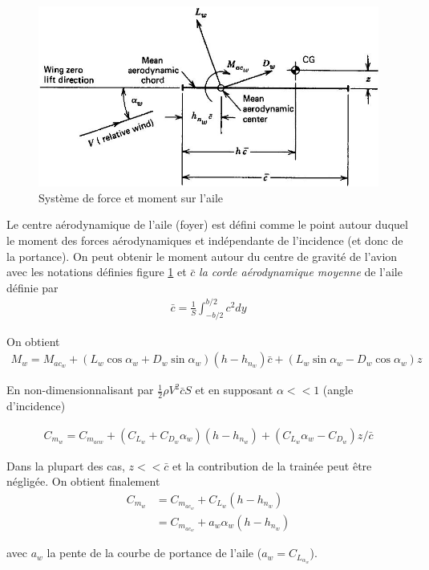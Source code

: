 \documentclass{report}
\begin{document}
\begin{figure}[h!]
    \centering
    \includegraphics[scale=0.7]{22.JPG}
    \caption{Système de force et moment sur l'aile}
    \label{22}
\end{figure}

Le centre aérodynamique de l'aile (foyer) est défini comme le point autour duquel le moment des forces aérodynamiques et indépendante de l'incidence (et donc de la portance). On peut obtenir le moment autour du centre de gravité de l'avion avec les notations définies figure \ref{22} et $\bar{c}$ \textit{la corde aérodynamique moyenne} de l'aile définie par 
\begin{eqnarray}
\bar{c}=\frac{1}{S}\int_{-b/2}^{b/2}c^2dy
\end{eqnarray}

On obtient
\begin{eqnarray}
M_w = M_{ac_w}+(L_w \cos\alpha_w + D_w \sin \alpha_w)(h-h_{n_w})\bar{c}+(L_w\sin\alpha_w-D_w\cos\alpha_w)z
\end{eqnarray}

En non-dimensionnalisant par $\frac{1}{2}\rho V^2\bar{c} S$ et en supposant $\alpha <<1$ (angle d'incidence)

\begin{eqnarray}
C_{m_w}=C_{m_{acw}}+(C_{L_w}+C_{D_w}\alpha_w)(h-h_{n_w})+(C_{L_w}\alpha_w-C_{D_w})z/\bar{c}
\end{eqnarray}

Dans la plupart des cas, $z<<\bar{c}$ et la contribution de la trainée peut être négligée. On obtient finalement
\begin{eqnarray}
C_{m_w}&=C_{m_{ac_w}}+C_{L_w}(h-h_{n_w})\\
 &=C_{m_{ac_w}}+a_w\alpha_w(h-h_{n_w})
\end{eqnarray}

avec $a_w$ la pente de la courbe de portance de l'aile ($a_w=C_{L_{\alpha_w}}$).
\end{document}
